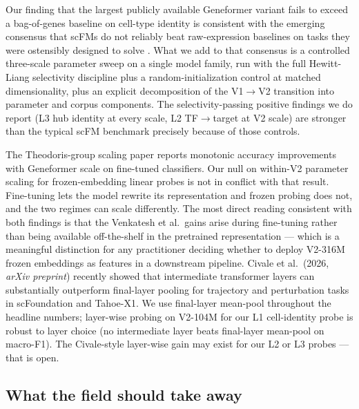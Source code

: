 \documentclass[10pt]{article}
\begin{document}
Our finding that the largest publicly available Geneformer variant fails
to exceed a bag-of-genes baseline on cell-type identity is consistent
with the emerging consensus that scFMs do not reliably beat
raw-expression baselines on tasks they were ostensibly designed to solve
\citep{boiarsky2025}. What we add to that consensus is a controlled three-scale
parameter sweep on a single model family, run with the full Hewitt-Liang
selectivity discipline plus a random-initialization control at matched
dimensionality, plus an explicit decomposition of the V1$\to$V2 transition
into parameter and corpus components. The selectivity-passing positive
findings we do report (L3 hub identity at every scale, L2 TF$\to$target at
V2 scale) are stronger than the typical scFM benchmark precisely because
of those controls.

The Theodoris-group scaling paper \citep{venkatesh2026} reports monotonic accuracy improvements with
Geneformer scale on fine-tuned classifiers. Our null on within-V2
parameter scaling for frozen-embedding linear probes is not in conflict
with that result. Fine-tuning lets the model rewrite its representation
and frozen probing does not, and the two regimes can scale differently.
The most direct reading consistent with both findings is that the
Venkatesh et al.~gains arise during fine-tuning rather than being
available off-the-shelf in the pretrained representation --- which is a
meaningful distinction for any practitioner deciding whether to deploy
V2-316M frozen embeddings as features in a downstream pipeline. Civale
et al.~(2026, \emph{arXiv preprint}) recently showed that intermediate
transformer layers can substantially outperform final-layer pooling for
trajectory and perturbation tasks in scFoundation and Tahoe-X1. We use
final-layer mean-pool \citep{reimers2019sbert} throughout the headline
numbers; layer-wise probing on V2-104M for our L1 cell-identity probe is
robust to layer choice (no intermediate layer beats final-layer
mean-pool on macro-F1). The Civale-style layer-wise gain may exist for
our L2 or L3 probes --- that is open.

\subsection{What the field should take
away}\label{what-the-field-should-take-away}
\end{document}
